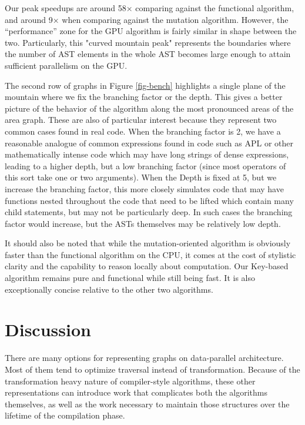 ﻿\documentclass[numbers,10pt,preprint]{sigplanconf}
\begin{document}
Our peak speedups are around 58× comparing against the functional algorithm, and around 9× when comparing against the mutation algorithm. However, the ``performance'' zone for the GPU algorithm is fairly similar in shape between the two. Particularly, this "curved mountain peak" represents the boundaries where the number of AST elements in the whole AST becomes large enough to attain sufficient parallelism on the GPU. 

The second row of graphs in Figure \ref{fig-bench} highlights a single plane of the mountain where we fix the branching factor or the depth. This gives a better picture of the behavior of the algorithm along the most pronounced areas of the area graph. These are also of particular interest because they represent two common cases found in real code. When the branching factor is 2, we have a reasonable analogue of common expressions found in code such as APL or other mathematically intense code which may have long strings of dense expressions, leading to a higher depth, but a low branching factor (since most operators of this sort take one or two arguments). When the Depth is fixed at 5, but we increase the branching factor, this more closely simulates code that may have functions nested throughout the code that need to be lifted which contain many child statements, but may not be particularly deep. In such cases the branching factor would increase, but the ASTs themselves may be relatively low depth. 

It should also be noted that while the mutation-oriented algorithm is obviously faster than the functional algorithm on the CPU, it comes at the cost of stylistic clarity and the capability to reason locally about computation. Our Key-based algorithm remains pure and functional while still being fast. It is also exceptionally concise relative to the other two algorithms.

\section{Discussion}

There are many options for representing graphs on data-parallel architecture. Most of them tend to optimize traversal instead of transformation. Because of the transformation heavy nature of compiler-style algorithms, these other representations can introduce work that complicates both the algorithms themselves, as well as the work necessary to maintain those structures over the lifetime of the compilation phase. 
\end{document}
